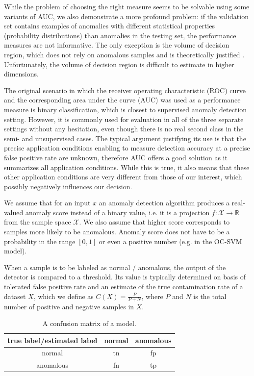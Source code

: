 While the problem of choosing the right measure seems to be solvable using some variants of AUC, we also demonstrate a more profound problem: if the validation set contains examples of anomalies with different statistical properties (probability distributions) than anomalies in the testing set, the performance measures are not informative. The only exception is the volume of decision region, which does not rely on anomalous samples and is theoretically justified \cite{steinwart2005classification}. Unfortunately, the volume of decision region is difficult to estimate in higher dimensions.

The original scenario in which the receiver operating characteristic (ROC) curve \cite{egan1975signal} and the corresponding area under the curve (AUC) was used as a performance measure is binary classification, which is closest to supervised anomaly detection setting. However, it is commonly used for evaluation in all of the three separate settings without any hesitation, even though there is no real second class in the semi- and unsupervised cases. The typical argument justifying its use is that the precise application conditions enabling to measure detection accuracy at a precise false positive rate are unknown, therefore AUC offers a good solution as it summarizes all application conditions. While this is true, it also means that these other application conditions are very different from those of our interest, which possibly negatively influences our decision. 

We assume that for an input $x$ an anomaly detection algorithm produces a real-valued anomaly score instead of a binary value, i.e. it is a projection $f:\mathcal{X} \rightarrow \mathbb{R}$ from the sample space $\mathcal{X}$. We also assume that higher score corresponds to samples more likely to be anomalous. Anomaly score does not have to be a probability in the range $[0, 1]$ or even a positive number (e.g. in the OC-SVM model). 

When a sample is to be labeled as normal / anomalous, the output of the detector is compared to a threshold. Its value is typically determined on basis of tolerated false positive rate and an estimate of the true contamination rate of a dataset $X$, which we define as $C(X)=\frac{P}{P+N}$, where $P$ and $N$ is the total number of positive and negative samples in $X$.

\begin{table}
\centering
	\begin{tabular}{c | c c}
		true label/estimated label & normal & anomalous \\
		\hline
		normal & tn & fp  \\
		anomalous & fn & tp 
	\end{tabular}
	\caption{A confusion matrix of a model.}
	\label{tab:conf_ex}
\end{table}

